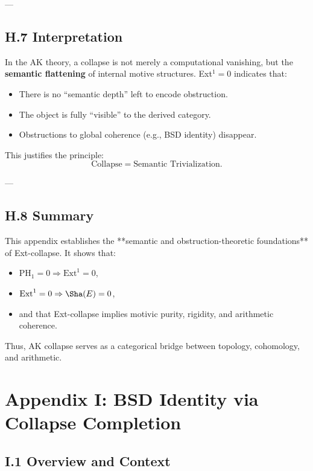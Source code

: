 ---

\subsection*{H.7 Interpretation}

In the AK theory, a collapse is not merely a computational vanishing,  
but the \textbf{semantic flattening} of internal motive structures.  
Ext$^1 = 0$ indicates that:

\begin{itemize}
  \item There is no “semantic depth” left to encode obstruction.
  \item The object is fully “visible” to the derived category.
  \item Obstructions to global coherence (e.g., BSD identity) disappear.
\end{itemize}

This justifies the principle:
\[
\text{Collapse} = \text{Semantic Trivialization}.
\]

---

\subsection*{H.8 Summary}

This appendix establishes the **semantic and obstruction-theoretic foundations** of Ext-collapse.  
It shows that:
\begin{itemize}
  \item \( \mathrm{PH}_1 = 0 \Rightarrow \mathrm{Ext}^1 = 0 \),
  \item \( \mathrm{Ext}^1 = 0 \Rightarrow \Sha(E) = 0 \),
  \item and that Ext-collapse implies motivic purity, rigidity, and arithmetic coherence.
\end{itemize}

Thus, AK collapse serves as a categorical bridge between topology, cohomology, and arithmetic.





\section*{Appendix I: BSD Identity via Collapse Completion}

\subsection*{I.1 Overview and Context}

